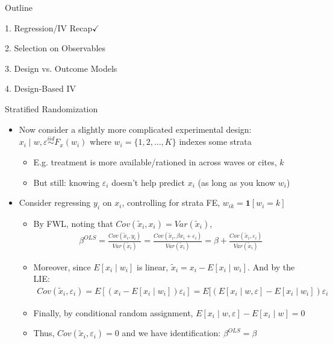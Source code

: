 \documentclass[11pt,english]{beamer}
\begin{document}
\begin{frame}{Outline}

\textcolor{red!75!green!50!blue!25!gray}{1. Regression/IV Recap}$\checkmark$
\vspace{0.8cm}

2. Selection on Observables
\vspace{0.8cm}

\textcolor{red!75!green!50!blue!25!gray}{3. Design vs. Outcome Models}
\vspace{0.8cm}

\textcolor{red!75!green!50!blue!25!gray}{4. Design-Based IV}

\end{frame}

\begin{frame}{Stratified Randomization}
\begin{itemize}
\item Now consider a slightly more complicated experimental design: $x_i\mid w, \varepsilon \stackrel{iid}{\sim} F_{x}(w_i)$ where $w_i=\{1,2,\dots,K\}$ indexes some strata\smallskip\pause{}
\begin{itemize}
\item E.g. treatment is more available/rationed in across waves or cites, $k$\smallskip
\item But still: knowing $\varepsilon_i$ doesn't help predict $x_i$ (as long as you know $w_i$)
\end{itemize}\medskip\pause{}
\item Consider regressing $y_i$ on $x_i$, controlling for strata FE, $w_{ik}=\mathbf{1}[w_i=k]$\smallskip\pause{}
\begin{itemize}
\item By FWL, noting that $Cov(\tilde{x}_i,x_i)=Var(\tilde{x}_i)$,
\begin{align*}
\beta^{OLS}=\frac{Cov(\tilde{x}_i,y_i)}{Var(\tilde{x}_i)}=\frac{Cov(\tilde{x}_i,\beta x_i+\varepsilon_i)}{Var(\tilde{x}_i)}=\beta +\frac{Cov(\tilde{x}_i,\varepsilon_i)}{Var(\tilde{x}_i)}
\end{align*}\pause{}
\item Moreover, since $E[x_i\mid w_i]$ is linear, $\tilde{x}_i=x_i-E[x_i\mid w_i]$. And by the LIE:
\begin{align*}
Cov(\tilde{x}_i,\varepsilon_i)=E[(x_i-E[x_i\mid w_i])\varepsilon_i]=E[(E[x_i\mid w,\varepsilon]-E[x_i\mid w_i])\varepsilon_i
\end{align*}\vspace{-0.5cm}\pause{}
\item Finally, by conditional random assignment, $E[x_i\mid w,\varepsilon]-E[x_i\mid w]=0$\smallskip\pause{}
\item Thus, $Cov(\tilde{x}_i,\varepsilon_i)=0$ and we have identification: $\beta^{OLS}=\beta$
\end{itemize}
\end{itemize}
\end{frame}
\end{document}
